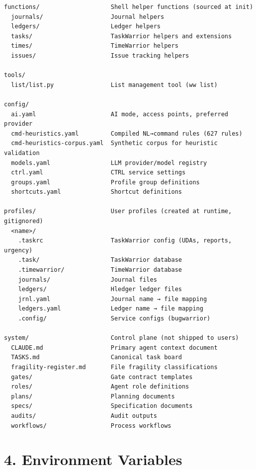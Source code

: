 \documentclass[11pt, a4paper, DIV=14]{scrartcl}
\let\origRule\rule
\renewcommand{\rule}[2]{\par\vspace{2pt}\noindent{\color{BabbBorder}\origRule[0pt]{#1}{#2}}\par\vspace{2pt}}
\begin{document}
\begin{verbatim}
functions/                    Shell helper functions (sourced at init)
  journals/                   Journal helpers
  ledgers/                    Ledger helpers
  tasks/                      TaskWarrior helpers and extensions
  times/                      TimeWarrior helpers
  issues/                     Issue tracking helpers

tools/
  list/list.py                List management tool (ww list)

config/
  ai.yaml                     AI mode, access points, preferred provider
  cmd-heuristics.yaml         Compiled NL→command rules (627 rules)
  cmd-heuristics-corpus.yaml  Synthetic corpus for heuristic validation
  models.yaml                 LLM provider/model registry
  ctrl.yaml                   CTRL service settings
  groups.yaml                 Profile group definitions
  shortcuts.yaml              Shortcut definitions

profiles/                     User profiles (created at runtime, gitignored)
  <name>/
    .taskrc                   TaskWarrior config (UDAs, reports, urgency)
    .task/                    TaskWarrior database
    .timewarrior/             TimeWarrior database
    journals/                 Journal files
    ledgers/                  Hledger ledger files
    jrnl.yaml                 Journal name → file mapping
    ledgers.yaml              Ledger name → file mapping
    .config/                  Service configs (bugwarrior)

system/                       Control plane (not shipped to users)
  CLAUDE.md                   Primary agent context document
  TASKS.md                    Canonical task board
  fragility-register.md       File fragility classifications
  gates/                      Gate contract templates
  roles/                      Agent role definitions
  plans/                      Planning documents
  specs/                      Specification documents
  audits/                     Audit outputs
  workflows/                  Process workflows
\end{verbatim}

\begin{center}\rule{0.5\linewidth}{0.5pt}\end{center}

\section{4. Environment Variables}\label{environment-variables}
\end{document}
